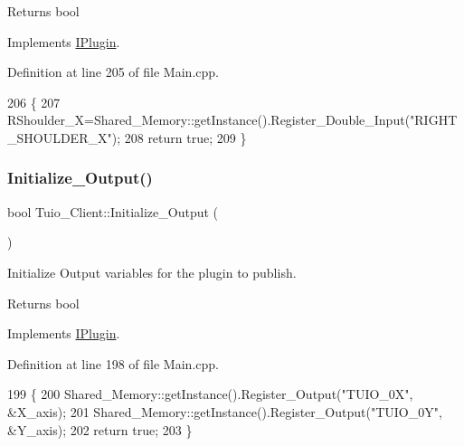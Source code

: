 \begin{DoxyReturn}{Returns}
bool 
\end{DoxyReturn}


Implements \hyperlink{class_i_plugin_aa7c66743ad956d8ada57becee559af4d}{I\+Plugin}.



Definition at line 205 of file Main.\+cpp.


\begin{DoxyCode}
206 \{
207     RShoulder\_X=Shared\_Memory::getInstance().Register\_Double\_Input(\textcolor{stringliteral}{"RIGHT\_SHOULDER\_X"});
208     \textcolor{keywordflow}{return} \textcolor{keyword}{true};
209 \}
\end{DoxyCode}
\mbox{\label{class_tuio___client_a170015752bb0bb4c7815a08150a42620}} 
\subsubsection{\texorpdfstring{Initialize\+\_\+\+Output()}{Initialize\_Output()}}
{\footnotesize\ttfamily bool Tuio\+\_\+\+Client\+::\+Initialize\+\_\+\+Output (\begin{DoxyParamCaption}{ }\end{DoxyParamCaption})\hspace{0.3cm}{\ttfamily [virtual]}}



Initialize Output variables for the plugin to publish. 

\begin{DoxyReturn}{Returns}
bool 
\end{DoxyReturn}


Implements \hyperlink{class_i_plugin_a0b772513fc8c4ed01240e19c4bb84068}{I\+Plugin}.



Definition at line 198 of file Main.\+cpp.


\begin{DoxyCode}
199 \{
200     Shared\_Memory::getInstance().Register\_Output(\textcolor{stringliteral}{"TUIO\_0X"}, &X\_axis);
201     Shared\_Memory::getInstance().Register\_Output(\textcolor{stringliteral}{"TUIO\_0Y"}, &Y\_axis);
202     \textcolor{keywordflow}{return} \textcolor{keyword}{true};
203 \}
\end{DoxyCode}
\mbox{\label{class_tuio___client_aef7de42628eef1f5c0fb3ff83b26de8b}} 
